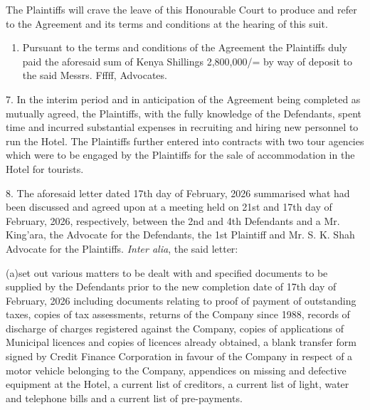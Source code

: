 \documentclass[12pt,a4paper]{article}
\begin{document}
\begin{justify}The Plaintiffs will crave the leave of this Honourable Court to produce and refer to the Agreement and its terms and conditions at the hearing of this suit.\end{justify}


\begin{enumerate}
\item Pursuant to the terms and conditions of the Agreement the Plaintiffs duly paid the aforesaid sum of Kenya Shillings 2,800,000/= by way of deposit to the said Messrs. Fffff, Advocates.

\end{enumerate}
\begin{flushleft}7.      In the interim period and in anticipation of the Agreement being completed as mutually agreed, the Plaintiffs, with the fully knowledge of the Defendants, spent time and incurred substantial expenses in recruiting and hiring new personnel to run the Hotel.  The Plaintiffs further entered into contracts with two tour agencies which were to be engaged by the Plaintiffs for the sale of accommodation in the Hotel for tourists.\end{flushleft}


\begin{justify}8.      The aforesaid letter dated 17th day of February, 2026 summarised what had been discussed and  agreed upon at a meeting held on 21st and 17th day of February, 2026, respectively, between the 2nd and 4th Defendants and a Mr. King’ara, the Advocate for the Defendants, the 1st Plaintiff and Mr. S. K. Shah Advocate for the Plaintiffs.  \textit{Inter alia}, the said letter:\end{justify}


\begin{justify}(a)set out various matters to be dealt with and specified documents to be supplied by the Defendants prior to the new completion date of 17th day of February, 2026 including documents relating to proof of payment of outstanding taxes, copies of tax assessments, returns of the Company since 1988, records of discharge of charges registered against the Company, copies of applications of Municipal licences and copies of licences already obtained, a blank transfer form signed by Credit Finance Corporation in favour of the Company in respect of a motor vehicle belonging to the Company, appendices on missing and defective equipment at the Hotel, a current list of creditors, a current list of light, water and telephone bills and a current list of pre-payments.\end{justify}
\end{document}
